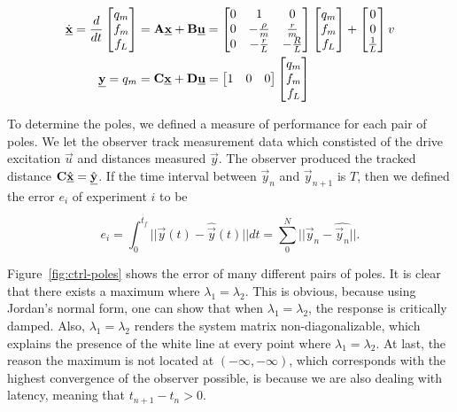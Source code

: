 \documentclass[11pt,titlepage]{report}
\begin{document}
\begin{align} \label{eq:ctrl-bond-model}
	\dot{\mathbf{\underline{x}}} = \frac{d}{dt}
	\begin{bmatrix}
		q_m \\
		f_m \\
		f_L
	\end{bmatrix} &= \mathbf{A} \mathbf{\underline{x}} + \mathbf{B} \mathbf{\underline{u}} =
	\begin{bmatrix}
		0 & 1 & 0 \\
		0 & -\frac{\rho}{m} & \frac{r}{m} \\
		0 & -\frac{r}{L} & -\frac{R}{L}
	\end{bmatrix}
	\begin{bmatrix}
		q_m \\
		f_m \\
		f_L
	\end{bmatrix} +
	\begin{bmatrix}
		0 \\
		0 \\
		\frac{1}{L}
	\end{bmatrix} v \\
	\mathbf{\underline{y}} = q_m &= \mathbf{C} \mathbf{\underline{x}} + \mathbf{D} \mathbf{\underline{u}} =
	\begin{bmatrix}
		1 & 0 & 0
	\end{bmatrix}
	\begin{bmatrix}
		q_m \\
		f_m \\
		f_L
	\end{bmatrix}
\end{align}

To determine the poles, we defined a measure of performance for each pair of poles. We let the observer track measurement data which constisted of the drive excitation $\vec{u}$ and distances measured $\vec{y}$. The observer produced the tracked distance $\mathbf{C} \hat{\mathbf{\underline{x}}} = \hat{\mathbf{\underline{y}}}$. If the time interval between $\vec{y}_n$ and $\vec{y}_{n+1}$ is $T$, then we defined the error $e_i$ of experiment $i$ to be

\begin{equation}
	e_i = \int_{0}^{t_f} || \vec{y}(t) - \hat{\vec{y}}(t) || dt = \sum_{0}^{N} ||\vec{y}_n - \hat{\vec{y}_n} ||.
\end{equation}

Figure~\ref{fig:ctrl-poles} shows the error of many different pairs of poles. It is clear that there exists a maximum where $\lambda_1=\lambda_2$. This is obvious, because using Jordan's normal form, one can show that when $\lambda_1 = \lambda_2$, the response is critically damped. Also, $\lambda_1 = \lambda_2$ renders the system matrix non-diagonalizable, which explains the presence of the white line at every point where $\lambda_1=\lambda_2$. At last, the reason the maximum is not located at $(-\infty,-\infty)$, which corresponds with the highest convergence of the observer possible, is because we are also dealing with latency, meaning that $t_{n+1}-t_n>0$.  
\end{document}
